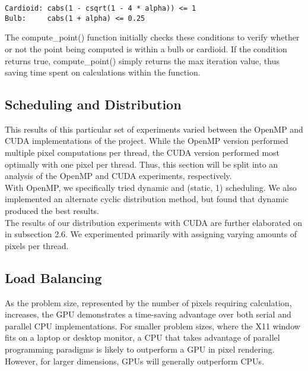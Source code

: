 \documentclass{article}
\begin{document}
\begin{verbatim}
Cardioid: cabs(1 - csqrt(1 - 4 * alpha)) <= 1
Bulb:     cabs(1 + alpha) <= 0.25
\end{verbatim}

The compute\_point() function initially checks these conditions to verify whether or not the point being computed is within a bulb or cardioid.
If the condition returns true, compute\_point() simply returns the max iteration value, thus saving time spent on calculations within the function.

\subsection{Scheduling and Distribution}

This results of this particular set of experiments varied between the OpenMP and CUDA implementations of the project.
While the OpenMP version performed multiple pixel computations per thread, the CUDA version performed most optimally with one pixel per thread.
Thus, this section will be split into an analysis of the OpenMP and CUDA experiments, respectively.\\

With OpenMP, we specifically tried dynamic and (static, 1) scheduling.
We also implemented an alternate cyclic distribution method, but found that dynamic produced the best results.\\

The results of our distribution experiments with CUDA are further elaborated on in subsection 2.6.
We experimented primarily with assigning varying amounts of pixels per thread.

\subsection{Load Balancing}

As the problem size, represented by the number of pixels requiring calculation, increases, the GPU demonstrates a time-saving advantage over both serial and parallel CPU implementations.
For smaller problem sizes, where the X11 window fits on a laptop or desktop monitor, a CPU that takes advantage of parallel programming paradigms is likely to outperform a GPU in pixel rendering.
However, for larger dimensions, GPUs will generally outperform CPUs.\\
\end{document}
